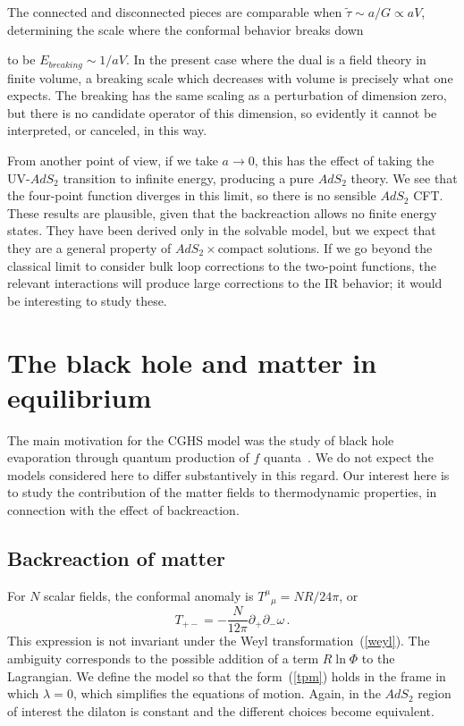 \documentclass[12pt]{article}
\newcommand{\JP}[1]{{\emph{\textcolor{red}{#1}}}}
\newcommand{\be}{\begin{equation}}
\newcommand{\ee}{\end{equation}}
\begin{document}
  The connected and disconnected pieces are comparable when $\tilde{\tau} \sim a / G \propto a  V$, determining the scale where the conformal behavior breaks down {to be $E_{breaking} \sim 1/ a V$. In the present case where the dual is a field theory in finite volume, a breaking scale which decreases with volume is precisely what one expects. %
The breaking has the same scaling as a perturbation of dimension zero, but there is no candidate operator of this dimension, so evidently it cannot be interpreted, or canceled, in this way.

From another point of view, if we take $a \to 0$, this has the effect of taking the UV-$AdS_2$ transition to infinite energy, producing a pure $AdS_2$ theory.  We see that the four-point function diverges in this limit, so there is no sensible $AdS_2$ CFT.  These results are plausible, given that the backreaction allows no finite energy states.  They have been derived only in the solvable model, but we expect that they are a general property of $AdS_2 \times$compact solutions. 
If we go beyond the classical limit to consider bulk loop corrections to the two-point functions, the relevant interactions will produce large corrections to the IR behavior; it would be interesting to study these.



\section{The black hole and matter in equilibrium}
\setcounter{equation}{0}

The main motivation for the CGHS model was the study of black hole evaporation through quantum production of $f$ quanta~\cite{Callan:1992rs}.  We do not expect the models considered here to differ substantively in this regard.  Our interest here is to study the contribution of the matter fields to thermodynamic properties, in connection with the effect of backreaction. 

\subsection{Backreaction of matter}

For $N$ scalar fields, the conformal anomaly is $T^\mu\!_\mu =  N R/24\pi$, or
\be
T_{+-} = -\frac{N}{12\pi} \partial_+ \partial_-  \omega\,. \label{tpm}
\ee
This expression is not invariant under the Weyl transformation~(\ref{weyl}).  The ambiguity corresponds to the possible addition of a term $R \ln \Phi$ to the Lagrangian.  We define the model so that the form~(\ref{tpm}) holds in the frame in which $\lambda = 0$, which simplifies the equations of motion.  Again, in the $AdS_2$ region of interest the dilaton is constant and the different choices become equivalent.

}
\end{document}

